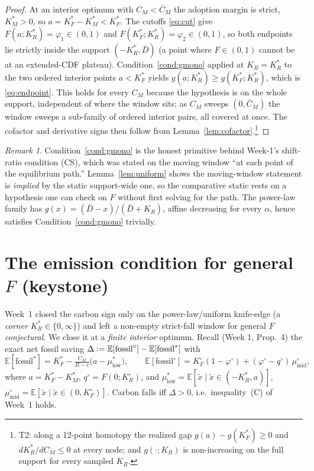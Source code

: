 \documentclass[11pt,reqno]{amsart}
\theoremstyle{plain}
\theoremstyle{definition}
\theoremstyle{remark}
\newtheorem{remark}{Remark}
\newcommand{\KR}{K_R}
\newcommand{\KRs}{K_R^{*}}
\newcommand{\KFs}{K_F^{*}}
\newcommand{\KMs}{K_M^{*}}
\newcommand{\KRo}{K_R^{\circ}}
\newcommand{\KFo}{K_F^{\circ}}
\newcommand{\Dbar}{\bar D}
\newcommand{\CM}{C_M}
\newcommand{\CMbar}{\bar C_M}
\newcommand{\E}{\mathbb{E}}
\newcommand{\eqdef}{\vcentcolon=}
\begin{document}
\begin{proof}
At an interior optimum with $\CM<\CMbar$ the adoption margin is strict,
$\KMs>0$, so $a=\KFs-\KMs<\KFs$. The cutoffs \eqref{eq:cut} give
$F(a;\KRs)=\varphi_1\in(0,1)$ and $F(\KFs;\KRs)=\varphi_2\in(0,1)$, so both
endpoints lie strictly inside the support $(-\KRs,\Dbar)$ (a point where $F\in(0,1)$
cannot be at an extended-CDF plateau). Condition~\ref{cond:gmono} applied at
$\KR=\KRs$ to the two ordered interior points $a<\KFs$ yields
$g(a;\KRs)\ge g(\KFs;\KRs)$, which is \eqref{eq:endpoint}. This holds for every
$\CM$ because the hypothesis is on the whole support, independent of where the
window sits; as $\CM$ sweeps $(0,\CMbar)$ the window sweeps a sub-family of
ordered interior pairs, all covered at once. The cofactor and derivative signs
then follow from Lemma~\ref{lem:cofactor}.\footnote{T2: along a 12-point
homotopy the realized gap $g(a)-g(\KFs)\ge0$ and $d\KRs/d\CM\le0$ at every node;
and $g(\cdot;\KR)$ is non-increasing on the full support for every sampled $\KR$.}
\end{proof}

\begin{remark}
Condition~\ref{cond:gmono} is the honest primitive behind Week-1's
shift-ratio condition (CS), which was stated on the moving window ``at each point of the
equilibrium path.'' Lemma~\ref{lem:uniform} shows the moving-window statement is
\emph{implied} by the static support-wide one, so the comparative static rests on
a hypothesis one can check on $F$ without first solving for the path. The
power-law family has $g(x)=(\Dbar-x)/(\Dbar+\KR)$, affine decreasing for every
$\alpha$, hence satisfies Condition~\ref{cond:gmono} trivially.
\end{remark}

\section{The emission condition for general $F$ (keystone)}\label{sec:keystone}

Week~1 closed the carbon sign only on the power-law/uniform knife-edge (a
\emph{corner} $\KRs\in\{0,\infty\}$) and left a non-empty strict-fall window for
general $F$ \emph{conjectural}. We close it at a \emph{finite interior} optimum.
Recall (Week 1, Prop.~4) the exact net fossil saving
$\Delta\eqdef\E[\text{fossil}^{\circ}]-\E[\text{fossil}^{*}]$ with
\begin{equation}\label{eq:fos}
  \E[\text{fossil}^{*}]=\KFs-\tfrac{\CM}{R-c}\big(a-\mu^{*}_{\mathrm{low}}\big),
  \qquad
  \E[\text{fossil}^{\circ}]=\KFo(1-\varphi^{\circ})+(\varphi^{\circ}-q^{\circ})\,\mu^{\circ}_{\mathrm{mid}},
\end{equation}
where $a=\KFs-\KMs$, $q^{\circ}=F(0;\KRo)$, and
$\mu^{*}_{\mathrm{low}}=\E[\tilde x\mid\tilde x\in(-\KRs,a)]$,
$\mu^{\circ}_{\mathrm{mid}}=\E[\tilde x\mid\tilde x\in(0,\KFo)]$. Carbon falls iff
$\Delta>0$, i.e.\ inequality~(C) of Week~1 holds.
\end{document}
